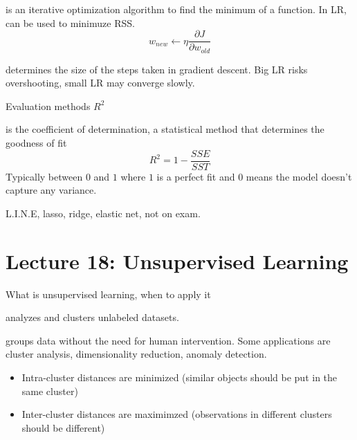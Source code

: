 \documentclass[12pt]{scrartcl}
\begin{document}
\begin{definition}
   is an iterative optimization algorithm 
  to find the minimum of a function. In LR, can be used to minimuze RSS. 
  \[w_{new} \leftarrow \eta \frac{\partial J}{\partial w_{old}}\]
\end{definition}

\begin{definition}
   determines the size of the steps taken in gradient descent. Big LR 
  risks overshooting, small LR may converge slowly.
\end{definition}

Evaluation methods $R^2$

\begin{definition}
   is the coefficient of determination, a statistical method that determines the goodness of fit
  \[R^2 = 1 - \frac{SSE}{SST}\]
  Typically between $0$ and $1$ where $1$ is a perfect fit and $0$ means the model doesn't capture any variance.
\end{definition}

\begin{note}
  L.I.N.E, lasso, ridge, elastic net, not on exam.
\end{note}

\section{Lecture 18: Unsupervised Learning}

What is unsupervised learning, when to apply it

\begin{definition}
   analyzes and clusters unlabeled datasets.
\end{definition}

\begin{definition}
   groups data without the need for human intervention. Some applications are 
  cluster analysis, dimensionality reduction, anomaly detection.

  \begin{itemize}
    \item Intra-cluster distances are minimized (similar objects should be put in the same cluster)
    \item Inter-cluster distances are maximimzed (observations in different clusters should be different)
  \end{itemize}
\end{definition}
\end{document}
